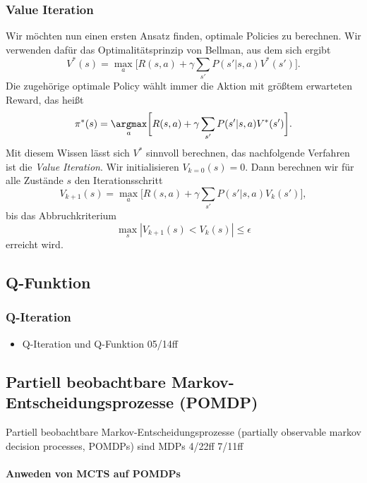 \documentclass[ngerman]{../LaTeX-Templates/Paper/paper}
\begin{document}
\subsubsection{Value Iteration}
Wir möchten nun einen ersten Ansatz finden, optimale Policies zu berechnen.
Wir verwenden dafür das Optimalitätsprinzip von Bellman, aus dem sich ergibt
\begin{equation*}
	V^\ast(s)=\max_a\bigg[R(s,a)+\gamma\sum_{s'}P(s'|s,a)V^\ast(s')\bigg].
\end{equation*}
Die zugehörige optimale Policy wählt immer die Aktion mit größtem erwarteten Reward, das heißt
\begin{equation*}
	\pi^\ast(s)=\underset a\argmax \bigg[R(s,a)+\gamma\sum_{s'}P(s'|s,a)V^\ast(s')\bigg].
\end{equation*}
Mit diesem Wissen lässt sich $V^\ast$ sinnvoll berechnen, das nachfolgende Verfahren ist die \emph{Value Iteration}.
Wir initialisieren $V_{k=0}(s)=0$. Dann berechnen wir für alle Zustände $s$ den Iterationsschritt
\begin{equation*}
	V_{k+1}(s)=\max_a\bigg[R(s,a)+\gamma\sum_{s'}P(s'|s,a)V_k(s')\bigg],
\end{equation*} 
bis das Abbruchkriterium
\begin{equation*}
	\max_s|V_{k+1}(s)<V_k(s)|\leq \epsilon
\end{equation*}
erreicht wird.


\subsection{Q-Funktion}
\subsubsection{Q-Iteration}

\begin{itemize}
	\item Q-Iteration und Q-Funktion 05/14ff
\end{itemize}





\subsection{Partiell beobachtbare Markov-Entscheidungsprozesse (POMDP)}
Partiell beobachtbare Markov-Entscheidungsprozesse (partially observable markov decision processes, POMDPs) sind MDPs
4/22ff
7/11ff

\paragraph{Anweden von MCTS auf POMDPs}
\end{document}
